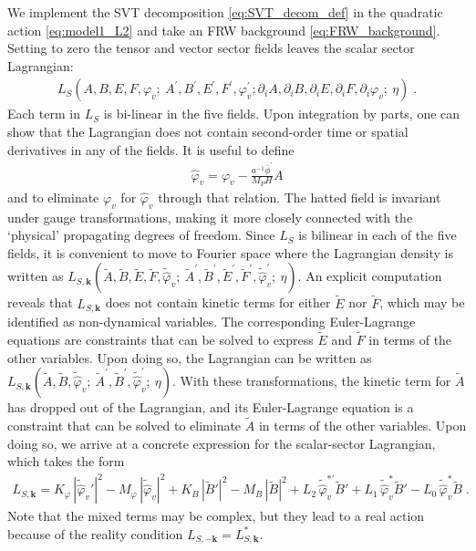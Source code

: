 \documentclass[11pt,a4paper]{article}
\newcommand{\ba}[1]{\begin{align} #1 \end{align}}
\newcommand{\kvec}{{\bm k}}
\newcommand{\Mpl}{M_P}
\newcommand{\LS}{L_S}
\newcommand{\LSk}{L_{S,\kvec}}
\begin{document}
We implement the SVT decomposition \eqref{eq:SVT_decom_def} in the quadratic action \eqref{eq:model1_L2} and take an FRW background \eqref{eq:FRW_background}.  Setting to zero the tensor and vector sector fields leaves the scalar sector Lagrangian: 
\ba{\label{eq:model1_LS}
    \LS(A, B, E, F, \varphi_v; \ A^\prime, B^\prime, E^\prime, F^\prime, \varphi_v^\prime;  \partial_i A, \partial_i B, \partial_i E, \partial_i F, \partial_i \varphi_v; \ \eta) 
    \;.
}
Each term in $\LS$ is bi-linear in the five fields. Upon integration by parts, one can show that the Lagrangian does not contain second-order time or spatial derivatives in any of the fields.  It is useful to define 
\ba{\label{eq:model1_phiv_to_phivhat}
    \hat{\varphi}_v = \varphi_v - \frac{a^{-1} \bar{\phi}^\prime}{\Mpl H} A
}
and to eliminate $\varphi_v$ for $\hat{\varphi}_v$ through that relation. The hatted field is invariant under gauge transformations, making it more closely connected with the `physical' propagating degrees of freedom.  Since $\LS$ is bilinear in each of the five fields, it is convenient to move to Fourier space where the Lagrangian density is written as $\LSk(\tilde{A}, \tilde{B}, \tilde{E}, \tilde{F}, \tilde{\hat{\varphi}}_v; \ \tilde{A}^\prime, \tilde{B}^\prime, \tilde{E}^\prime, \tilde{F}^\prime, \tilde{\hat{\varphi}}_v^\prime; \ \eta) $. An explicit computation reveals that $\LSk$ does not contain kinetic terms for either $\tilde{E}$ nor $\tilde{F}$, which may be identified as non-dynamical variables. The corresponding Euler-Lagrange equations are constraints that can be solved to express $\tilde{E}$ and $\tilde{F}$ in terms of the other variables.  Upon doing so, the Lagrangian can be written as $\LSk(\tilde{A}, \tilde{B}, \tilde{\hat{\varphi}}_v; \ \tilde{A}^\prime, \tilde{B}^\prime, \tilde{\hat{\varphi}}_v^\prime; \ \eta)$.  With these transformations, the kinetic term for $\tilde{A}$ has dropped out of the Lagrangian, and its Euler-Lagrange equation is a constraint that can be solved to eliminate $\tilde{A}$ in terms of the other variables.  Upon doing so, we arrive at a concrete expression for the scalar-sector Lagrangian, which takes the form 
\ba{\label{eq:model1_LSk}
    \LSk = 
    K_{\varphi} \, | \tilde{\hat{\varphi}}_v' |^2 
    - M_{\varphi} \, | \tilde{\hat{\varphi}}_v |^2 
    + K_{B} \, | \tilde{B}' |^2 
    - M_{B} \, | \tilde{B} |^2 
    + L_2 \, \tilde{\hat{\varphi}}_v^{\ast\prime} \tilde{B}' 
    + L_1 \, \tilde{\hat{\varphi}}_v^\ast \tilde{B}' 
    - L_0 \, \tilde{\hat{\varphi}}_v^\ast \tilde{B}
    \;.
}
Note that the mixed terms may be complex, but they lead to a real action because of the reality condition $L_{S,-\kvec} = \LSk^\ast$.  
\end{document}
